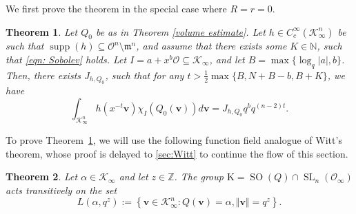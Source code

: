 \documentclass[11pt,a4paper,reqno]{amsart}
\newtheorem{theorem}{Theorem}[section]
\theoremstyle{definition}
\theoremstyle{remark}
\numberwithin{equation}{section}
\begin{document}
We first prove the theorem in the special case where $R=r=0$.
\begin{theorem}
\label{thm:VolR=0}
    Let $Q_0$ be as in Theorem \ref{volume estimate}. Let $h\in C_c^{\infty}(\mathcal{K}_{\infty}^n)$ be such that $\operatorname{supp}(h)\subseteq \mathcal{O}^n\setminus \mathfrak{m}^n$, and assume that there exists some $K\in \mathbb{N}$, such that \eqref{eqn: Sobolev} holds. Let $I=a+x^{b}\mathcal{O}\subseteq \mathcal{K}_{\infty}$, and let $B=\max\{\log_q\vert a\vert,b\}$. Then, there exists $J_{h,Q_0}$, such that for any $t>\frac{1}{2}\max\{B,N+B-b,B+K\}$, we have
    $$\int_{\mathcal{K}_{\infty}^n}h(x^{-t}\mathbf{v})\chi_I(Q_0(\mathbf{v}))d\mathbf{v}=J_{h,Q_0}q^bq^{(n-2)t}.$$
\end{theorem}
To prove Theorem~\ref{thm:VolR=0}, we will use the following function field analogue of Witt's theorem, whose proof is delayed to \cref{sec:Witt} to continue the flow of this section.
\begin{theorem}\label{thm: Witt}
    Let $\alpha\in \mathcal{K}_{\infty}$ and let $z\in\mathbb{Z}$. The group $\mathrm{K}=\operatorname{SO}(Q)\cap \operatorname{SL}_n(\mathcal{O}_{\infty})$ acts transitively on the set
    $$L(\alpha,q^z):=\left\{\mathbf{v}\in \mathcal{K}_{\infty}^n:Q(\mathbf{v})=\alpha,\Vert \mathbf{v}\Vert=q^z\right\}.$$
\end{theorem}
\end{document}
